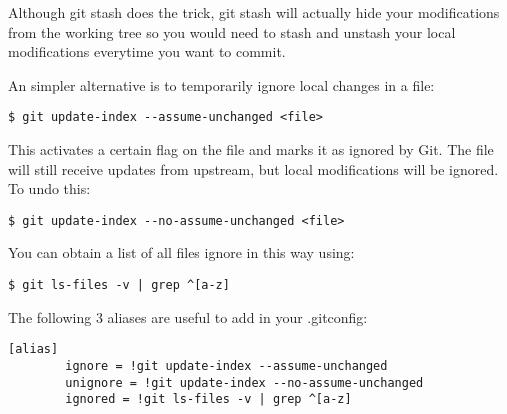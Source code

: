 \documentclass[a4paper]{../../common/tufte-latex/tufte-handout}
\begin{document}
Although git stash does the trick, git stash will actually hide your modifications from the working tree so you would need to stash and unstash your local modifications everytime you want to commit.

An simpler alternative is to temporarily ignore local changes in a file:
\begin{lstlisting}[style=BashInputStyle]
  $ git update-index --assume-unchanged <file>
\end{lstlisting}

This activates a certain flag on the file and marks it as ignored by Git.
The file will still receive updates from upstream, but local modifications will be ignored.
To undo this:

\begin{lstlisting}[style=BashInputStyle]
  $ git update-index --no-assume-unchanged <file>
\end{lstlisting}

You can obtain a list of all files ignore in this way using:

\begin{lstlisting}[style=BashInputStyle]
  $ git ls-files -v | grep ^[a-z]
\end{lstlisting}

The following 3 aliases are useful to add in your .gitconfig:

\begin{lstlisting}[style=BashInputStyle]
[alias]
        ignore = !git update-index --assume-unchanged 
        unignore = !git update-index --no-assume-unchanged
        ignored = !git ls-files -v | grep ^[a-z]
\end{lstlisting}

%
%
\end{document}
